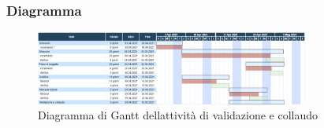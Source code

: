	\subsubsection{Diagramma}
		\begin{figure}[H]
        		\centering
        		\includegraphics[width=0.8\textwidth]{source/img/Validazione_collaudo.png}
        		\caption{Diagramma di Gantt dell\textquotesingle attività di validazione e collaudo}
    		\end{figure}